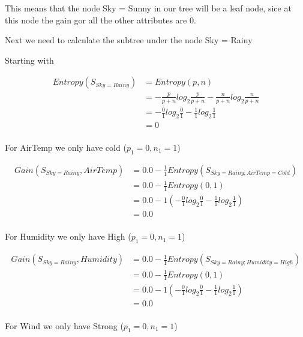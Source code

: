 \documentclass[10pt,a4paper]{article}
\begin{document}
{{{{{{{{{{This means that the node Sky = Sunny in our tree will be a leaf node, sice at this node the gain gor all the other attributes are 0.

Next we need to calculate the subtree under the node Sky = Rainy

Starting with  

\begin{equation}
\begin{split}
Entropy(S_{Sky=Rainy}) &= Entropy(p,n) \\
                       &= -\frac{p}{p+n}log_2\frac{p}{p+n} - \frac{n}{p+n}log_2\frac{n}{p+n}  \\
                       &= -\frac{0}{1} log_2\frac{0}{1} -\frac{1}{1} log_2\frac{1}{1} \\
                       &= 0   \\
\end{split}
\end{equation}

For AirTemp we only have cold ($p_1=0,n_1=1$)

\begin{equation}
\begin{split}
Gain(S_{Sky=Rainy},AirTemp) &= 0.0 - \frac{1}{1} Entropy(S_{Sky=Rainy;AirTemp=Cold} )\\
          &= 0.0 - \frac{1}{1} Entropy(0,1) \\
          &= 0.0 - 1( -\frac{0}{1} log_2\frac{0}{1} -\frac{1}{1} log_2\frac{1}{1} )  \\
          &= 0.0 \\
\end{split}
\end{equation}

For Humidity we only have High ($p_1=0,n_1=1$)

\begin{equation}
\begin{split}
Gain(S_{Sky=Rainy},Humidity) &= 0.0 - \frac{1}{1} Entropy(S_{Sky=Rainy;Humidity=High} )\\
          &= 0.0 - \frac{1}{1} Entropy(0,1) \\
          &= 0.0 - 1( -\frac{0}{1} log_2\frac{0}{1} -\frac{1}{1} log_2\frac{1}{1} )  \\
          &= 0.0 \\
\end{split}
\end{equation}

For Wind we only have Strong ($p_1=0,n_1=1$)

}}}}}}}}}}
\end{document}
